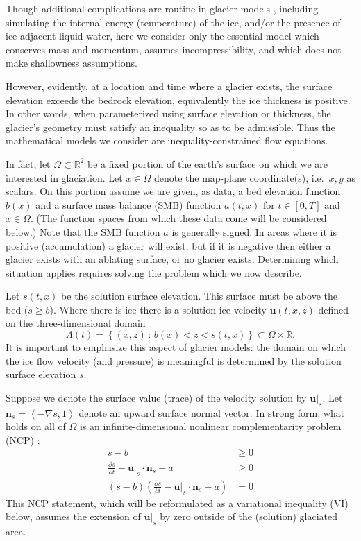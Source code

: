 \documentclass[hidelinks,onefignum,onetabnum,final]{siamart220329}  %
\newcommand{\RR}{\mathbb{R}}
\newcommand{\grad}{\nabla}
\newcommand{\bn}{\mathbf{n}}
\newcommand{\bu}{\mathbf{u}}
\begin{document}
Though additional complications are routine in glacier models \cite{GreveBlatter2009}, including simulating the internal energy (temperature) of the ice, and/or the presence of ice-adjacent liquid water, here we consider only the essential model which conserves mass and momentum, assumes incompressibility, and which does not make shallowness assumptions.

However, evidently, at a location and time where a glacier exists, the surface elevation exceeds the bedrock elevation, equivalently the ice thickness is positive.  In other words, when parameterized using surface elevation or thickness, the glacier's geometry must satisfy an inequality so as to be admissible.  Thus the mathematical models we consider are inequality-constrained flow equations.

In fact, let $\Omega \subset \RR^2$ be a fixed portion of the earth's surface on which we are interested in glaciation.  Let $x\in\Omega$ denote the map-plane coordinate(s), i.e.~$x,y$ as scalars.  On this portion assume we are given, as data, a bed elevation function $b(x)$ and a surface mass balance (SMB) function $a(t,x)$ for $t\in [0,T]$ and $x\in \Omega$.  (The function spaces from which these data come will be considered below.)  Note that the SMB function $a$ is generally signed.  In areas where it is positive (accumulation) a glacier will exist, but if it is negative then either a glacier exists with an ablating surface, or no glacier exists.  Determining which situation applies requires solving the problem which we now describe.

Let $s(t,x)$ be the solution surface elevation.  This surface must be above the bed ($s\ge b$).  Where there is ice there is a solution ice velocity $\bu(t,x,z)$ defined on the three-dimensional domain
\begin{equation}
\Lambda(t) = \left\{(x,z)\,:\,b(x) < z < s(t,x)\right\} \subset \Omega \times \RR. \label{eq:icydomain}
\end{equation}
It is important to emphasize this aspect of glacier models: the domain on which the ice flow velocity (and pressure) is meaningful is determined by the solution surface elevation $s$.

Suppose we denote the surface value (trace) of the velocity solution by $\bu|_s$.  Let $\bn_s = \left<-\grad s,1\right>$ denote an upward surface normal vector.  In strong form, what holds on all of $\Omega$ is an infinite-dimensional nonlinear complementarity problem (NCP) \cite{FacchineiPang2003}:
\begin{subequations}
\label{eq:ncp}
\begin{align}
s - b &\ge 0 \\
\frac{\partial s}{\partial t} - \bu|_s \cdot \bn_s - a &\ge 0 \\
(s - b) \left(\frac{\partial s}{\partial t} - \bu|_s \cdot \bn_s - a\right) &= 0
\end{align}
\end{subequations}
This NCP statement, which will be reformulated as a variational inequality (VI) \cite{KinderlehrerStampacchia1980} below, assumes the extension of $\bu|_s$ by zero outside of the (solution) glaciated area.
\end{document}
